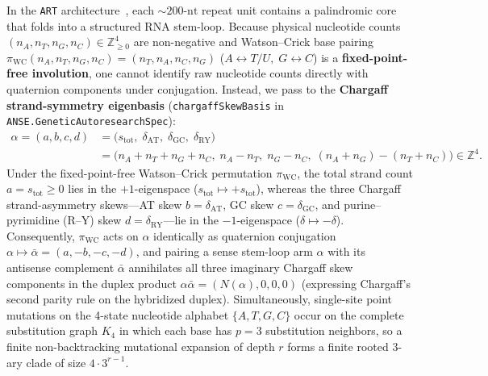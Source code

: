 \documentclass[11pt,a4paper]{article}
\theoremstyle{definition}
\begin{document}
In the \texttt{ART} architecture~\cite{yoon2026art}, each $\sim 200\text{-nt}$ repeat unit contains a palindromic core that folds into a structured RNA stem-loop. Because physical nucleotide counts $(n_A, n_T, n_G, n_C) \in \mathbb{Z}_{\ge 0}^4$ are non-negative and Watson--Crick base pairing $\pi_{\mathrm{WC}}(n_A, n_T, n_G, n_C) = (n_T, n_A, n_C, n_G)$ ($A \leftrightarrow T/U,\; G \leftrightarrow C$) is a \textbf{fixed-point-free involution}, one cannot identify raw nucleotide counts directly with quaternion components under conjugation. Instead, we pass to the \textbf{Chargaff strand-symmetry eigenbasis} (\texttt{chargaffSkewBasis} in \texttt{ANSE.GeneticAutoresearchSpec}):
\begin{equation}
\begin{aligned}
  \alpha = (a, b, c, d) &= \bigl(s_{\mathrm{tot}},\; \delta_{\mathrm{AT}},\; \delta_{\mathrm{GC}},\; \delta_{\mathrm{RY}}\bigr) \\
  &= \bigl(n_A + n_T + n_G + n_C,\; n_A - n_T,\; n_G - n_C,\; (n_A + n_G) - (n_T + n_C)\bigr) \in \mathbb{Z}^4.
\end{aligned}
\end{equation}
Under the fixed-point-free Watson--Crick permutation $\pi_{\mathrm{WC}}$, the total strand count $a = s_{\mathrm{tot}} \ge 0$ lies in the $+1$-eigenspace ($s_{\mathrm{tot}} \mapsto +s_{\mathrm{tot}}$), whereas the three Chargaff strand-asymmetry skews---AT skew $b = \delta_{\mathrm{AT}}$, GC skew $c = \delta_{\mathrm{GC}}$, and purine--pyrimidine (R--Y) skew $d = \delta_{\mathrm{RY}}$---lie in the $-1$-eigenspace ($\delta \mapsto -\delta$). Consequently, $\pi_{\mathrm{WC}}$ acts on $\alpha$ identically as quaternion conjugation $\alpha \mapsto \bar{\alpha} = (a, -b, -c, -d)$, and pairing a sense stem-loop arm $\alpha$ with its antisense complement $\bar{\alpha}$ annihilates all three imaginary Chargaff skew components in the duplex product $\alpha\bar{\alpha} = (N(\alpha), 0, 0, 0)$ (expressing Chargaff's second parity rule on the hybridized duplex). Simultaneously, single-site point mutations on the 4-state nucleotide alphabet $\{A, T, G, C\}$ occur on the complete substitution graph $K_4$ in which each base has $p = 3$ substitution neighbors, so a finite non-backtracking mutational expansion of depth $r$ forms a finite rooted $3$-ary clade of size $4 \cdot 3^{r-1}$.
\end{document}
